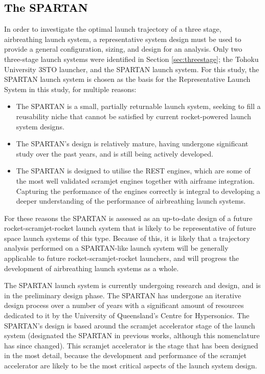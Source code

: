 \textcolor{black}{
\section{The SPARTAN}
}

\noindent
In order to investigate the optimal launch trajectory of a three stage, airbreathing launch system, a representative system design must be used to provide a general configuration, sizing, and design for an analysis. Only two three-stage launch systems were identified in Section \ref{sec:threestage}; the Tohoku University 3STO launcher, and the SPARTAN launch system. For this study, the SPARTAN launch system is chosen as the basis for the Representative Launch System in this study, for multiple reasons:
\begin{itemize}
	\item The SPARTAN is a small, partially returnable launch system, seeking to fill a reusability niche that cannot be satisfied by current rocket-powered launch system designs.
	\item The SPARTAN's design is relatively mature, having undergone significant study over the past years, and is still being actively developed.
	\item The SPARTAN is designed to utilise the REST engines, which are some of the most well validated scramjet engines together with airframe integration. Capturing the performance of the engines correctly is integral to developing a deeper understanding of the performance of airbreathing launch systems.
\end{itemize}
For these reasons the SPARTAN is assessed as an up-to-date design of a future rocket-scramjet-rocket launch system that is likely to be representative of future space launch systems of this type. Because of this, it is likely that a trajectory analysis performed on a SPARTAN-like launch system will be generally applicable to future rocket-scramjet-rocket launchers, and will progress the development of airbreathing launch systems as a whole. 




 

 The SPARTAN launch system is currently undergoing research and design, and is in the preliminary design phase. The SPARTAN has undergone an iterative design process over a number of years\cite{Jazra2013,Preller2017b} with a significant amount of resources dedicated to it by the University of Queensland's Centre for Hypersonics.
 The SPARTAN's design is based around the scramjet accelerator stage of the launch system (designated the SPARTAN in previous works, although this nomenclature has since changed). This scramjet accelerator is the stage that has been designed in the most detail\cite{Jazra2013,Preller2017b}, because the development and performance of the scramjet accelerator are likely to be the most critical aspects of the launch system design. 
 
